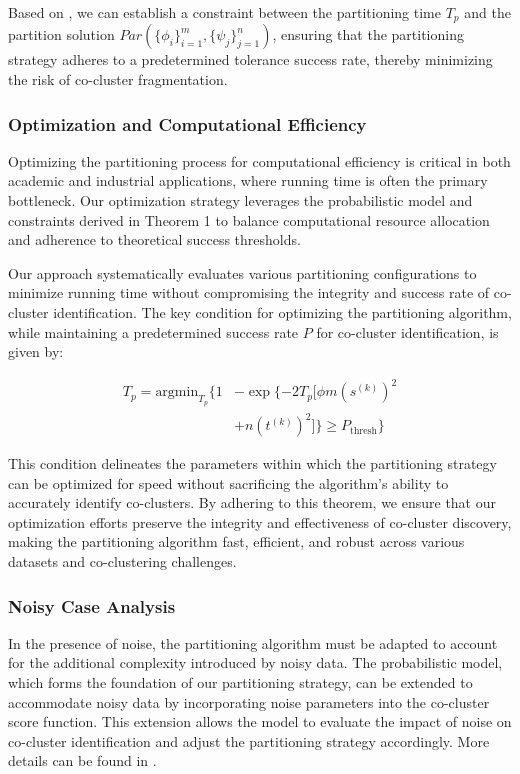 \documentclass[journal]{IEEEtran}
\begin{document}
Based on , we can establish a constraint between the partitioning time $T_p$ and the partition solution $Par(\{\phi_i\}_{i=1}^m, \{\psi_j\}_{j=1}^n)$, ensuring that the partitioning strategy adheres to a predetermined tolerance success rate, thereby minimizing the risk of co-cluster fragmentation.

\subsubsection{Optimization and Computational Efficiency}

Optimizing the partitioning process for computational efficiency is critical in both academic and industrial applications, where running time is often the primary bottleneck. Our optimization strategy leverages the probabilistic model and constraints derived in Theorem 1 to balance computational resource allocation and adherence to theoretical success thresholds.

Our approach systematically evaluates various partitioning configurations to minimize running time without compromising the integrity and success rate of co-cluster identification. The key condition for optimizing the partitioning algorithm, while maintaining a predetermined success rate \( P \) for co-cluster identification, is given by:

\begin{align*}
  T_p = \text{argmin}_{T_p} \{
  1 & - \exp \{ -2 T_p [\phi m (s^{(k)})^2         \\
    & + n (t^{(k)})^2] \} \ge P_{\text{thresh}} \}
\end{align*}

This condition delineates the parameters within which the partitioning strategy can be optimized for speed without sacrificing the algorithm's ability to accurately identify co-clusters. By adhering to this theorem, we ensure that our optimization efforts preserve the integrity and effectiveness of co-cluster discovery, making the partitioning algorithm fast, efficient, and robust across various datasets and co-clustering challenges.

\subsubsection{Noisy Case Analysis}

In the presence of noise, the partitioning algorithm must be adapted to account for the additional complexity introduced by noisy data. The probabilistic model, which forms the foundation of our partitioning strategy, can be extended to accommodate noisy data by incorporating noise parameters into the co-cluster score function. This extension allows the model to evaluate the impact of noise on co-cluster identification and adjust the partitioning strategy accordingly. More details can be found in .
\end{document}

